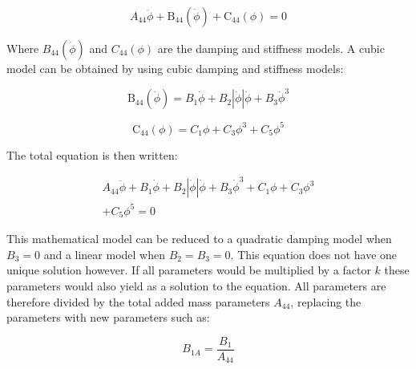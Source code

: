             
    
    \begin{equation}
A_{44} \ddot{\phi} + \operatorname{B_{44}}\left(\dot{\phi}\right) + \operatorname{C_{44}}\left(\phi\right) = 0
\label{eq:equation}
\end{equation}

    

    Where $B_{44}(\dot{\phi})$ and $C_{44}(\phi)$ are the damping and
stiffness models. A cubic model can be obtained by using cubic damping
and stiffness models:
 
            
    
    \begin{equation}
\operatorname{B_{44}}\left(\dot{\phi}\right) = B_{1} \dot{\phi} + B_{2} \left|{\dot{\phi}}\right| \dot{\phi} + B_{3} \dot{\phi}^{3}
\label{eq:equation}
\end{equation}

    
 
            
    
    \begin{equation}
\operatorname{C_{44}}\left(\phi\right) = C_{1} \phi + C_{3} \phi^{3} + C_{5} \phi^{5}
\label{eq:equation}
\end{equation}

    

    The total equation is then written:
 
            
    
    \begin{equation}
\begin{aligned}
A_{44} \ddot{\phi} + B_{1} \dot{\phi} + B_{2} \left|{\dot{\phi}}\right| \dot{\phi} + B_{3} \dot{\phi}^{3} + C_{1} \phi + C_{3} \phi^{3} \\ + C_{5} \phi^{5} = 0
\end{aligned}
\label{eq:equation}
\end{equation}

    

    This mathematical model can be reduced to a quadratic damping model when
$B_3=0$ and a linear model when $B_2=B_3=0$. This equation does not
have one unique solution however. If all parameters would be multiplied
by a factor $k$ these parameters would also yield as a solution to the
equation. All parameters are therefore divided by the total added mass
parameters $A_{44}$, replacing the parameters with new parameters such
as:
 
            
    
    \begin{equation}
B_{1A} = \frac{B_{1}}{A_{44}}
\label{eq:equation}
\end{equation}

